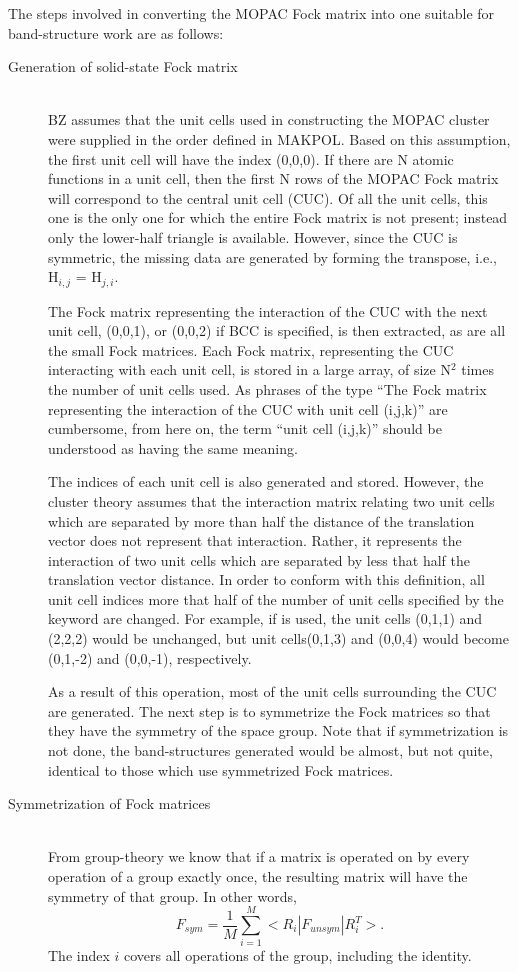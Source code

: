 The steps involved in converting the MOPAC Fock matrix into one suitable
for band-structure work are as follows:
\begin{description}
\item[Generation of solid-state Fock matrix]~\\ BZ assumes that the unit cells
used in constructing the MOPAC cluster were  supplied in the
order defined in MAKPOL.  Based on this assumption, the first unit cell will
have the index (0,0,0).  If there are N atomic functions in a unit cell, then
the first N rows of the MOPAC Fock matrix will correspond to the central unit
cell (CUC).  Of all the unit cells, this one is the only one for which the
entire Fock matrix is not present; instead only the lower-half triangle is
available.  However, since the CUC is symmetric, the missing data are generated
by forming the transpose, i.e., H$_{i,j}$ = H$_{j,i}$.

The Fock matrix representing the interaction of the CUC with the next
 unit cell, (0,0,1), or (0,0,2) if BCC is specified, is then
extracted, as are all the small Fock matrices.  Each Fock matrix, representing
the CUC interacting with each unit cell, is stored in a large array, of size
N$^2$ times the number of unit cells used.  As phrases of the type ``The Fock
matrix  representing the interaction of the CUC with unit cell (i,j,k)'' are
cumbersome, from here on, the term ``unit cell (i,j,k)'' should be understood
as having the same meaning.

The indices of each unit cell is also generated and stored.  However, the
cluster theory assumes that the interaction matrix relating two unit cells
which  are separated by more than half the distance of the translation vector
does not represent that interaction. Rather, it represents the interaction of
two unit cells which are separated by less that half the translation vector
distance.  In order to conform with this definition, all unit cell indices more
that half of the number  of unit cells specified by the 
keyword are changed.  For example, if  is used, the unit
cells (0,1,1) and (2,2,2) would be unchanged, but unit cells(0,1,3) and (0,0,4)
would become (0,1,-2) and (0,0,-1), respectively.

As a result of this operation, most of the unit cells surrounding the CUC are
generated.  The next step is to symmetrize the Fock matrices so that they have
the symmetry of the space group.  Note that if symmetrization is not done, the
band-structures generated would be almost, but not quite, identical to those
which use symmetrized Fock matrices.

\item[Symmetrization of Fock matrices]~\\
From group-theory we know that if a matrix is operated on by every operation of
a group exactly once, the resulting matrix will have the symmetry of that
group.  In other words,
$$
F_{sym} = \frac{1}{M}\sum_{i=1}^M<R_i|F_{unsym}|R_i^T>.
$$
The index $i$ covers all operations of the group, including the identity.

\end{description}

